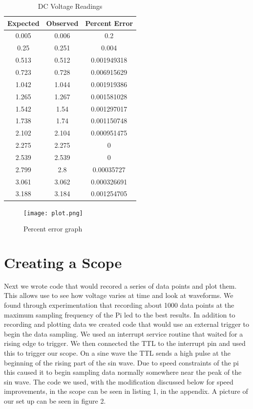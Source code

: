 \documentclass[prl,12pt,notitlepage,aps,onecolumn,superscriptaddress]{revtex4-1}
\begin{document}
\begin{table}[h]
 \centering
 \caption{DC Voltage Readings}
   \begin{tabular}{c|c|c}
   \toprule
   Expected & Observed & Percent Error \\
   \midrule
   0.005 & 0.006 & 0.2 \\
   0.25  & 0.251 & 0.004 \\
   0.513 & 0.512 & 0.001949318 \\
   0.723 & 0.728 & 0.006915629 \\
   1.042 & 1.044 & 0.001919386 \\
   1.265 & 1.267 & 0.001581028 \\
   1.542 & 1.54  & 0.001297017 \\
   1.738 & 1.74  & 0.001150748 \\
   2.102 & 2.104 & 0.000951475 \\
   2.275 & 2.275 & 0 \\
   2.539 & 2.539 & 0 \\
   2.799 & 2.8   & 0.00035727 \\
   3.061 & 3.062 & 0.000326691 \\
   3.188 & 3.184 & 0.001254705 \\
   \bottomrule
   \end{tabular}%
 \label{tab:addlabel}%
\end{table}%

\begin{figure}[h]
\begin{center}
\texttt{[image: plot.png]}
\end{center}
\caption{\label{fig:pic} Percent error graph}
\end{figure}

\section{Creating a Scope}
Next we wrote code that would recored a series of data points and plot them. This allows use to see how voltage varies at time and look at waveforms. We found through experimentation that recording about 1000 data points at the maximum sampling frequency of the Pi led to the best results. In addition to recording and plotting data we created code that would use an external trigger to begin the data sampling. We used an interrupt service routine that waited for a rising edge to trigger. We then connected the TTL to the interrupt pin and used this to trigger our scope. On a sine wave the TTL sends a high pulse at the beginning of the rising part of the sin wave. Due to speed constraints of the pi this caused it to begin sampling data normally somewhere near the peak of the sin wave. The code we used, with the modification discussed below for speed improvements, in the scope can be seen in listing 1, in the appendix. A picture of our set up can be seen in figure 2.
\end{document}
